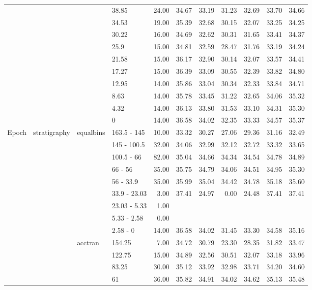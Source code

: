 \begin{longtable}{llllrrrrrrr}
   &  &  & 38.85 & 24.00 & 34.67 & 33.19 & 31.23 & 32.69 & 33.70 & 34.66 \\ 
   &  &  & 34.53 & 19.00 & 35.39 & 32.68 & 30.15 & 32.07 & 33.25 & 34.25 \\ 
   &  &  & 30.22 & 16.00 & 34.69 & 32.62 & 30.31 & 31.65 & 33.41 & 34.37 \\ 
   &  &  & 25.9 & 15.00 & 34.81 & 32.59 & 28.47 & 31.76 & 33.19 & 34.24 \\ 
   &  &  & 21.58 & 15.00 & 36.17 & 32.90 & 30.14 & 32.07 & 33.57 & 34.41 \\ 
   &  &  & 17.27 & 15.00 & 36.39 & 33.09 & 30.55 & 32.39 & 33.82 & 34.80 \\ 
   &  &  & 12.95 & 14.00 & 35.86 & 33.04 & 30.34 & 32.33 & 33.84 & 34.71 \\ 
   &  &  & 8.63 & 14.00 & 35.78 & 33.45 & 31.22 & 32.65 & 34.06 & 35.32 \\ 
   &  &  & 4.32 & 14.00 & 36.13 & 33.80 & 31.53 & 33.10 & 34.31 & 35.30 \\ 
   &  &  & 0 & 14.00 & 36.58 & 34.02 & 32.35 & 33.33 & 34.57 & 35.37 \\ 
  Epoch & stratigraphy & equalbins & 163.5 - 145 & 10.00 & 33.32 & 30.27 & 27.06 & 29.36 & 31.16 & 32.49 \\ 
   &  &  & 145 - 100.5 & 32.00 & 34.06 & 32.99 & 32.12 & 32.72 & 33.32 & 33.65 \\ 
   &  &  & 100.5 - 66 & 82.00 & 35.04 & 34.66 & 34.34 & 34.54 & 34.78 & 34.89 \\ 
   &  &  & 66 - 56 & 35.00 & 35.75 & 34.79 & 34.06 & 34.51 & 34.95 & 35.30 \\ 
   &  &  & 56 - 33.9 & 35.00 & 35.99 & 35.04 & 34.42 & 34.78 & 35.18 & 35.60 \\ 
   &  &  & 33.9 - 23.03 & 3.00 & 37.41 & 24.97 & 0.00 & 24.48 & 37.41 & 37.41 \\ 
   &  &  & 23.03 - 5.33 & 1.00 &  &  &  &  &  &  \\ 
   &  &  & 5.33 - 2.58 & 0.00 &  &  &  &  &  &  \\ 
   &  &  & 2.58 - 0 & 14.00 & 36.58 & 34.02 & 31.45 & 33.30 & 34.58 & 35.16 \\ 
   &  & acctran & 154.25 & 7.00 & 34.72 & 30.79 & 23.30 & 28.35 & 31.82 & 33.47 \\ 
   &  &  & 122.75 & 15.00 & 34.89 & 32.56 & 30.51 & 32.07 & 33.18 & 33.96 \\ 
   &  &  & 83.25 & 30.00 & 35.12 & 33.92 & 32.98 & 33.71 & 34.20 & 34.60 \\ 
   &  &  & 61 & 36.00 & 35.82 & 34.91 & 34.02 & 34.62 & 35.13 & 35.48 \\ 

\end{longtable}
